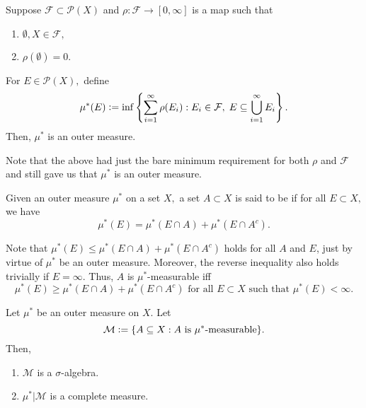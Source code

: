 \documentclass[12pt]{article}	%
\begin{document}
\begin{prop} \label{prop:constructoutermeasure}
	Suppose $\mathcal{F} \subset \mathcal{P}(X)$ and $\rho : \mathcal{F} \to [0, \infty]$ is a map such that
	\begin{enumerate}
		\item $\emptyset, X \in \mathcal{F},$
		\item $\rho(\emptyset) = 0.$
	\end{enumerate}
	For $E \in \mathcal{P}(X),$ define
	\begin{equation*} 
		\mu^*(E) \vcentcolon= \inf\left\{\sum_{i = 1}^{\infty}\rho(E_i) : E_i \in \mathcal{F},\; E \subset \bigcup_{i = 1}^\infty E_i\right\}.
	\end{equation*}
	Then, $\mu^*$ is an outer measure.
\end{prop}
Note that the above had just the bare minimum requirement for both $\rho$ and $\mathcal{F}$ and still gave us that $\mu^*$ is an outer measure.

\begin{defn}[$\mu^*$-measurable]
	Given an outer measure $\mu^*$ on a set $X,$ a set $A \subset X$ is said to be  if for all $E \subset X,$ we have
	\begin{equation*} 
		\mu^*(E) = \mu^*(E \cap A) + \mu^*(E \cap A^c).
	\end{equation*}
\end{defn}
Note that $\mu^*(E) \le \mu^*(E \cap A) + \mu^*(E \cap A^c)$ holds for all $A$ and $E$, just by virtue of $\mu^{\ast}$ be an outer measure. Moreover, the reverse inequality also holds trivially if $E = \infty$. Thus, $A$ is $\mu^{\ast}$-measurable iff
\begin{equation*} 
	\mu^{\ast}(E) \ge \mu^*(E \cap A) + \mu^*(E \cap A^c) \text{ for all $E \subset X$ such that $\mu^{\ast}(E) < \infty$.}
\end{equation*}

\begin{thm}[Carathéodory]
	Let $\mu^*$ be an outer measure on $X.$ Let
	\begin{equation*} 
		\mathcal{M} \vcentcolon= \{A \subset X : A \text{ is } \mu^*\text{-measurable}\}.
	\end{equation*}
	Then,
	\begin{enumerate}
		\item $\mathcal{M}$ is a $\sigma$-algebra.
		\item $\mu^*|\mathcal{M}$ is a complete measure.
	\end{enumerate} 
\end{thm}
\end{document}

